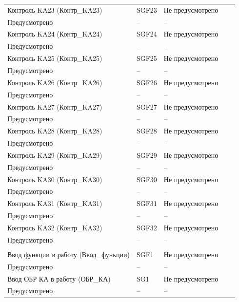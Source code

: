 \begin{longtable}{|>{\centering\arraybackslash}m{5.3cm}|>{\centering\arraybackslash}m{3.3cm}|>{\centering\arraybackslash}m{4.2cm}|>{\centering\arraybackslash}m{1.8cm}|>{\centering\arraybackslash}m{1cm}|}
\hline
\centering Контроль KA23 (Контр\_KA23)  & \centering SGF23 & \centering Не предусмотрено \\ Предусмотрено & \centering -- & \centering \arraybackslash -- \\
\hline
\centering Контроль KA24 (Контр\_KA24)  & \centering SGF24 & \centering Не предусмотрено \\ Предусмотрено & \centering -- & \centering \arraybackslash -- \\
\hline
\centering Контроль KA25 (Контр\_KA25)  & \centering SGF25 & \centering Не предусмотрено \\ Предусмотрено & \centering -- & \centering \arraybackslash -- \\
\hline
\centering Контроль KA26 (Контр\_KA26)  & \centering SGF26 & \centering Не предусмотрено \\ Предусмотрено & \centering -- & \centering \arraybackslash -- \\
\hline
\centering Контроль KA27 (Контр\_KA27)  & \centering SGF27 & \centering Не предусмотрено \\ Предусмотрено & \centering -- & \centering \arraybackslash -- \\
\hline
\centering Контроль KA28 (Контр\_KA28)  & \centering SGF28 & \centering Не предусмотрено \\ Предусмотрено & \centering -- & \centering \arraybackslash -- \\
\hline
\centering Контроль KA29 (Контр\_KA29)  & \centering SGF29 & \centering Не предусмотрено \\ Предусмотрено & \centering -- & \centering \arraybackslash -- \\
\hline
\centering Контроль KA30 (Контр\_KA30)  & \centering SGF30 & \centering Не предусмотрено \\ Предусмотрено & \centering -- & \centering \arraybackslash -- \\
\hline
\centering Контроль KA31 (Контр\_KA31)  & \centering SGF31 & \centering Не предусмотрено \\ Предусмотрено & \centering -- & \centering \arraybackslash -- \\
\hline
\centering Контроль KA32 (Контр\_KA32)  & \centering SGF32 & \centering Не предусмотрено \\ Предусмотрено & \centering -- & \centering \arraybackslash -- \\
\hline
\multicolumn{5}{|c|}{ КП } \\ \hline 
\centering Ввод функции в работу (Ввод\_функции)  & \centering SGF1 & \centering Не предусмотрено \\ Предусмотрено & \centering -- & \centering \arraybackslash -- \\
\hline
\centering Ввод ОБР КА в работу (ОБР\_КА)  & \centering SG1 & \centering Не предусмотрено \\ Предусмотрено & \centering -- & \centering \arraybackslash -- \\
\hline
\end{longtable}
\normalsize


